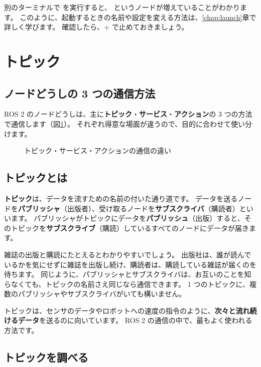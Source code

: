 別のターミナルで  を実行すると、 というノードが増えていることがわかります。
このように、起動するときの名前や設定を変える方法は、\ref{chap:launch}章で詳しく学びます。
確認したら、+ で止めておきましょう。

\section{トピック}
\label{sec:ros2-concepts-topic}

\subsection{ノードどうしの 3 つの通信方法}

ROS 2 のノードどうしは、主に\textbf{トピック}・\textbf{サービス}・\textbf{アクション}の 3 つの方法で通信します（図\ref{fig:ros2-concepts-communication}）。
それぞれ得意な場面が違うので、目的に合わせて使い分けます。

\begin{figure}[tb]
  \centering
  
  \caption{トピック・サービス・アクションの通信の違い}
  \label{fig:ros2-concepts-communication}
\end{figure}

\subsection{トピックとは}

\textbf{トピック}は、データを流すための名前の付いた通り道です。
データを送るノードを\textbf{パブリッシャ}（出版者）、受け取るノードを\textbf{サブスクライバ}（購読者）といいます。
パブリッシャがトピックにデータを\textbf{パブリッシュ}（出版）すると、そのトピックを\textbf{サブスクライブ}（購読）しているすべてのノードにデータが届きます。

雑誌の出版と購読にたとえるとわかりやすいでしょう。
出版社は、誰が読んでいるかを気にせずに雑誌を出版し続け、購読者は、購読している雑誌が届くのを待ちます。
同じように、パブリッシャとサブスクライバは、お互いのことを知らなくても、トピックの名前さえ同じなら通信できます。
1 つのトピックに、複数のパブリッシャやサブスクライバがいても構いません。

トピックは、センサのデータやロボットへの速度の指令のように、\textbf{次々と流れ続けるデータ}を送るのに向いています。
ROS 2 の通信の中で、最もよく使われる方法です。

\subsection{トピックを調べる}

